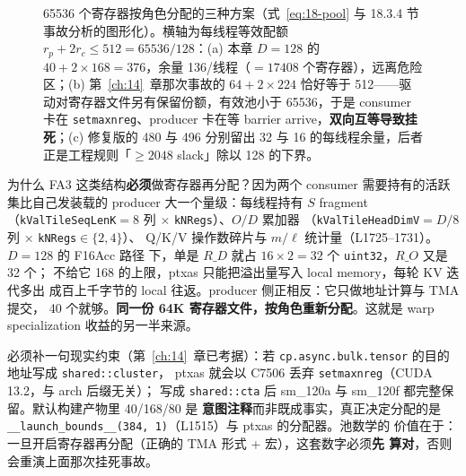 \begin{figure}[H]
\caption{65536 个寄存器按角色分配的三种方案（式~\ref{eq:18-pool} 与 18.3.4 节事故分析的图形化）。横轴为每线程等效配额 $r_p + 2r_c \le 512 = 65536/128$：(a) 本章 $D{=}128$ 的 $40+2\times168=376$，余量 136/线程（$=17408$ 个寄存器），远离危险区；(b) 第~\ref{ch:14}~章那次事故的 $64+2\times224$ 恰好等于 512——驱动对寄存器文件另有保留份额，有效池小于 65536，于是 consumer 卡在 \texttt{setmaxnreg}、producer 卡在等 barrier arrive，\textbf{双向互等导致挂死}；(c) 修复版的 480 与 496 分别留出 32 与 16 的每线程余量，后者正是工程规则「$\ge 2048$ slack」除以 128 的下界。}
\label{fig:18-reg-pool}
\end{figure}

为什么 FA3 这类结构\textbf{必须}做寄存器再分配？因为两个 consumer 需要持有的活跃
集比自己发装载的 producer 大一个量级：每线程持有 $S$ fragment
（\texttt{k\allowbreak{}Val\allowbreak{}Tile\allowbreak{}Seq\allowbreak{}Len\allowbreak{}K}$=8$ 列 $\times$ \texttt{kNRegs}）、$O/D$ 累加器
（\texttt{k\allowbreak{}Val\allowbreak{}Tile\allowbreak{}Head\allowbreak{}Dim\allowbreak{}V}$= D/8$ 列 $\times$ \texttt{kNRegs}$\in\{2,4\}$）、
Q/K/V 操作数碎片与 $m/\ell$ 统计量（L1725--1731）。$D{=}128$ 的 F16Acc 路径
下，单是 $R\_D$ 就占 $16 \times 2 = 32$ 个 \texttt{uint32}，$R\_O$ 又是 32 个；
不给它 168 的上限，ptxas 只能把溢出量写入 local memory，每轮 KV 迭代多出
成百上千字节的 local 往返。producer 侧正相反：它只做地址计算与 TMA 提交，
40 个就够。\textbf{同一份 64K 寄存器文件，按角色重新分配}。这就是 warp
specialization 收益的另一半来源。

必须补一句现实约束（第~\ref{ch:14}~章已考据）：若
\texttt{cp.\allowbreak{}async.\allowbreak{}bulk.\allowbreak{}tensor} 的目的地址写成 \texttt{shared::cluster}，
ptxas 就会以 C7506 丢弃 \texttt{setmaxnreg}（CUDA 13.2，与 arch 后缀无关）；
写成 \texttt{shared::cta} 后 sm\_120a 与 sm\_120f 都完整保留。默认构建产物里
40/168/80 是
\textbf{意图注释}而非既成事实，真正决定分配的是
\texttt{\_\allowbreak{}\_\allowbreak{}launch\_\allowbreak{}bounds\_\allowbreak{}\_\allowbreak{}(384,\allowbreak{} 1)}（L1515）与 ptxas 的分配器。池数学的
价值在于：一旦开启寄存器再分配（正确的 TMA 形式 + 宏），这套数字必须\textbf{先
算对}，否则会重演上面那次挂死事故。

